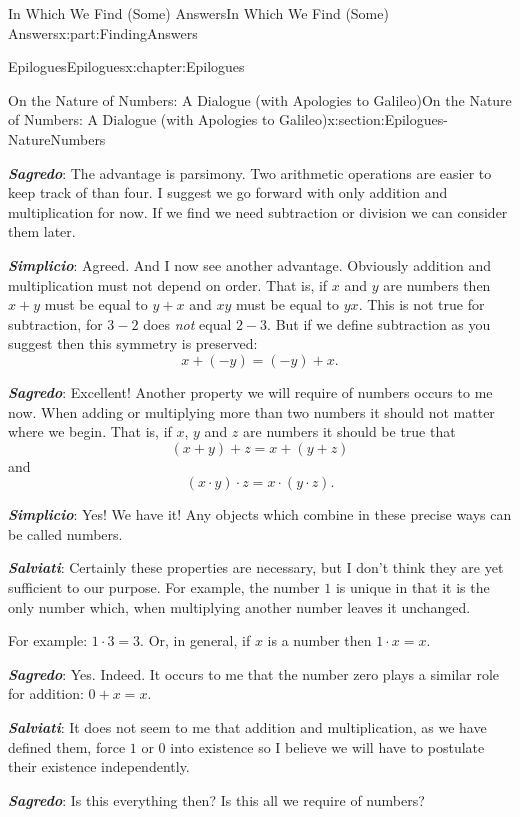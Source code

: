 \documentclass[oneside,10pt,]{book}
\newcommand{\alert}[1]{\textbf{\textit{#1}}}
\numberwithin{equation}{section}
\begin{document}
\begin{partptx}{In Which We Find (Some) Answers}{}{In Which We Find (Some) Answers}{}{}{x:part:FindingAnswers}
\begin{chapterptx}{Epilogues}{}{Epilogues}{}{}{x:chapter:Epilogues}
\begin{sectionptx}{On the Nature of Numbers: A Dialogue (with Apologies to Galileo)}{}{On the Nature of Numbers: A Dialogue (with Apologies to Galileo)}{}{}{x:section:Epilogues-NatureNumbers}
\begin{introduction}{}
\par
\alert{Sagredo}:  The advantage is parsimony. Two arithmetic operations are easier to keep track of than four. I suggest we go forward with only addition and multiplication for now. If we find we need subtraction or division we can consider them later.%
\par
\alert{Simplicio}:  Agreed. And I now see another advantage. Obviously addition and multiplication must not depend on order. That is, if \(x\) and \(y\) are numbers then \(x+y\) must be equal to \(y+x\) and \(xy\) must be equal to \(yx\). This is not true for subtraction, for \(3-2\) does \emph{not} equal \(2-3\). But if we define subtraction as you suggest then this symmetry is preserved:%
\begin{equation*}
x+(-y) = (-y)+x\text{.}
\end{equation*}
%
\par
\alert{Sagredo}:  Excellent! Another property we will require of numbers occurs to me now. When adding or multiplying more than two numbers it should not matter where we begin. That is, if \(x\), \(y\) and \(z\) are numbers it should be true that%
\begin{equation*}
(x+y)+z = x+(y+z)
\end{equation*}
and%
\begin{equation*}
(x\cdot y)\cdot z = x\cdot(y\cdot z)\text{.}
\end{equation*}
%
\par
\alert{Simplicio}:  Yes! We have it! Any objects which combine in these precise ways can be called numbers.%
\par
\alert{Salviati}:  Certainly these properties are necessary, but I don't think they are yet sufficient to our purpose. For example, the number \(1\) is unique in that it is the only number which, when multiplying another number leaves it unchanged.%
\par
For example:  \(1\cdot3=3\). Or, in general, if \(x\) is a number then \(1\cdot x =x\).%
\par
\alert{Sagredo}:  Yes. Indeed. It occurs to me that the number zero plays a similar role for addition: \(0+x=x\).%
\par
\alert{Salviati}:  It does not seem to me that addition and multiplication, as we have defined them, force \(1\) or \(0\) into existence so I believe we will have to postulate their existence independently.%
\par
\alert{Sagredo}:  Is this everything then? Is this all we require of numbers?%
\par

\end{introduction}
\end{sectionptx}
\end{chapterptx}
\end{partptx}
\end{document}
